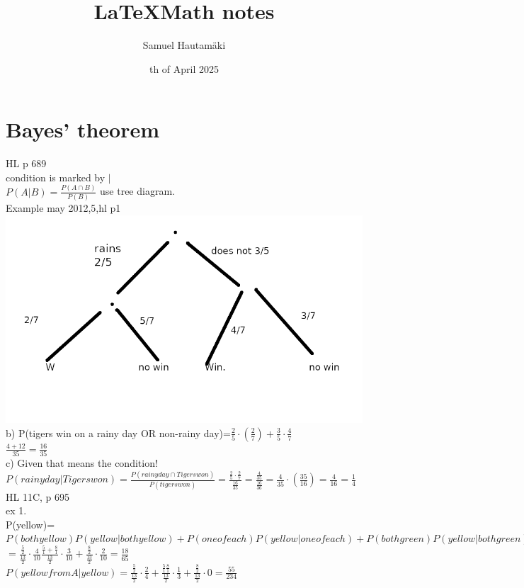 \documentclass{article}
\title{\LaTeX Math notes}
\author{Samuel Hautamäki}
\date{th of April 2025}
\begin{document}
  \maketitle
   
  \section{Bayes' theorem} 
  HL p 689\\
  condition is marked by $|$\\
  $P(A|B)=\frac{P(A\cap B)}{P(B)}$ use tree diagram.\\
  Example may 2012,5,hl p1\\
  \includegraphics {tigers-rain}
  b) P(tigers win on a rainy day OR non-rainy day)=$\frac{2}{5}\cdot (\frac{2}{7})+\frac{3}{5}\cdot\frac{4}{7}$\\
  $\frac{4+12}{35}=\frac{16}{35}$\\
  c) Given that means the condition!\\
  $P(rainy day | Tigers won)=\frac{P(rainy day \cap Tigers won)}{P(tigers won)}=\frac{\frac{2}{5}\cdot\frac{2}{7}}{\frac{16}{35}}=\frac{\frac{4}{35}}{\frac{16}{36}}=\frac{4}{35}\cdot(\frac{35}{16})=\frac{4}{16}=\frac{1}{4}$\\
  HL 11C, p 695\\
  ex 1.\\
  P(yellow)=$P(both yellow)P(yellow | both yellow)+P(one of each)P(yellow | one of each)+P(both green)P(yellow | both green)$\\
  $=\frac{\frac{5}{2}}{\frac{13}{2}}\cdot \frac{4}{10}\frac{\frac{5}{1}+\frac{8}{1}}{\frac{13}{2}}\cdot\frac{3}{10}+\frac{\frac{8}{2}}{\frac{13}{2}}\cdot\frac{2}{10}=\frac{18}{65}$\\
  $P(yellow from A|yellow)=\frac{\frac{5}{2}}{\frac{13}{2}}\cdot\frac{2}{4}+\frac{\frac{5}{1}\frac{8}{1}}{\frac{13}{2}}\cdot\frac{1}{3}+\frac{\frac{8}{2}}{\frac{13}{2}}\cdot0=\frac{55}{234}$\\
  

   
\end{document}
